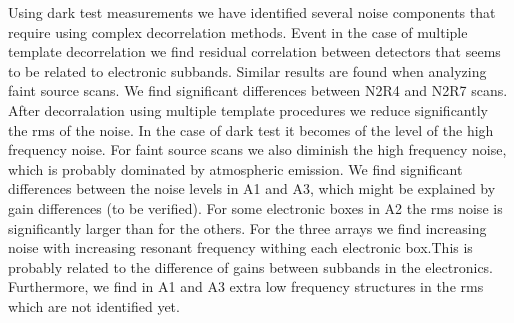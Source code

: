 Using dark test measurements we have identified several noise components that require using complex decorrelation methods. Event in the case of multiple template decorrelation we find residual correlation between detectors that seems to be related to electronic subbands. Similar results are found when analyzing faint source scans. We find significant differences between N2R4 and N2R7 scans. \\

After decorralation using multiple template procedures we reduce significantly the rms of the noise. In the case of dark test it becomes of the level of the high frequency noise. For faint source scans we also diminish the high frequency noise, which is probably dominated by atmospheric emission. We find significant differences between the noise levels in A1 and A3, which might be explained by gain differences (to be verified). For some electronic boxes in A2 the rms noise is significantly larger than for the others. For the three arrays we find increasing noise with increasing resonant frequency withing each electronic box.This is probably related to the difference of gains between subbands in the electronics. Furthermore, we find in A1 and A3 extra low frequency structures in the rms which are not identified yet.
